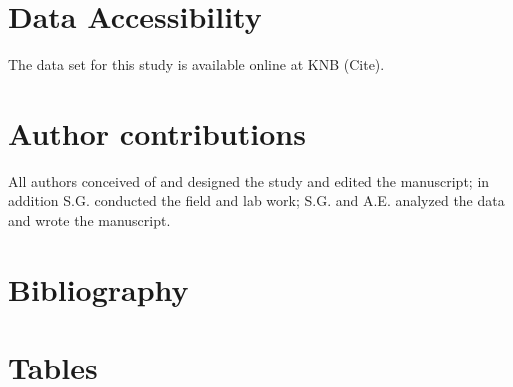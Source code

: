 \documentclass{article}
\begin{document}
\section*{Data Accessibility}
The data set for this study is available online at KNB (Cite). 

\section*{Author contributions} All authors conceived of and designed the study and edited the manuscript; in addition S.G. conducted the field and lab work; S.G. and A.E. analyzed the data and wrote the manuscript.

\section{Bibliography}


\section* {Tables}
\end{document}
